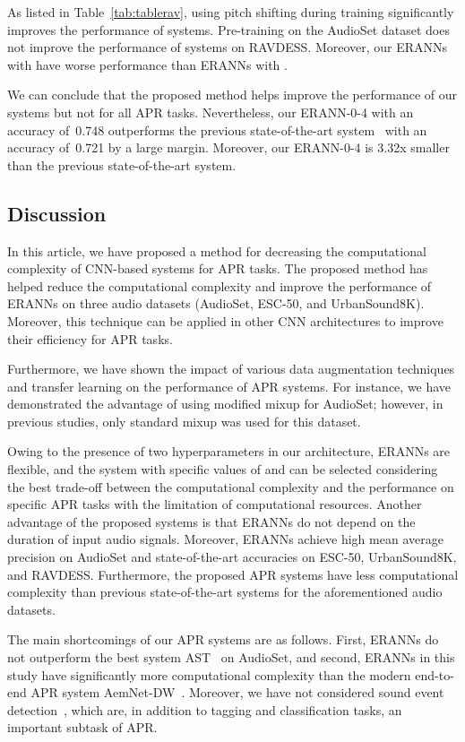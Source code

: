 \documentclass{article}
\begin{document}
\begin{sloppy}
As listed in Table~\ref{tab:tablerav}, using pitch shifting during training significantly improves the performance of systems. Pre-training on the AudioSet dataset does not improve the performance of systems on RAVDESS. Moreover, our ERANNs with  have worse performance than ERANNs with .

We can conclude that the proposed method helps improve the performance of our systems but not for all APR tasks. Nevertheless, our \mbox{ERANN-0-4} with an accuracy of~0.748 outperforms the previous state-of-the-art system~\cite{9229505} with an accuracy of~0.721 by a large margin. Moreover, our \mbox{ERANN-0-4} is 3.32x smaller than the previous state-of-the-art system.

\subsection{Discussion}
In this article, we have proposed a method for decreasing the computational complexity of CNN-based systems for APR tasks. The proposed method has helped reduce the computational complexity and improve the performance of ERANNs on three audio datasets (AudioSet, ESC-50, and UrbanSound8K). Moreover, this technique can be applied in other CNN architectures to improve their efficiency for APR tasks.

Furthermore, we have shown the impact of various data augmentation techniques and transfer learning on the performance of APR systems. For instance, we have demonstrated the advantage of using modified mixup for AudioSet; however, in previous studies, only standard mixup was used for this dataset.

Owing to the presence of two hyperparameters in our architecture, ERANNs are flexible, and the system with specific values of  and  can be selected considering the best trade-off between the computational complexity and the performance on specific APR tasks with the limitation of computational resources. Another advantage of the proposed systems is that ERANNs do not depend on the duration of input audio signals. Moreover, ERANNs achieve high mean average precision on AudioSet and state-of-the-art accuracies on ESC-50, UrbanSound8K, and RAVDESS. Furthermore, the proposed APR systems have less computational complexity than previous state-of-the-art systems for the aforementioned audio datasets.

The main shortcomings of our APR systems are as follows. First, ERANNs do not outperform the best system AST~\cite{gong21b_interspeech} on \hbox{AudioSet}, and second, ERANNs in this study have significantly more computational complexity than the modern end-to-end APR system AemNet-DW~\cite{9414229}. Moreover, we have not considered sound event detection~\cite{Turpault2019_DCASE}, which are, in addition to tagging and classification tasks, an important subtask of APR.



\end{sloppy}
\end{document}
